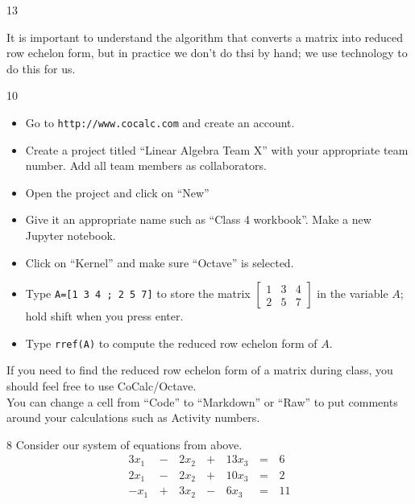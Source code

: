 \begin{applicationActivities}{1}{3}
\begin{remark}
It is important to understand the  algorithm that converts a matrix into reduced row echelon form, but in practice we don't do thsi by hand; we use technology to do this for us.
\end{remark}

\begin{activity}{10}
\begin{itemize}
\item Go to {\tt http://www.cocalc.com} and create an account.
\item Create a project titled ``Linear Algebra Team X'' with your appropriate team number.  Add all team members as collaborators.
\item Open the project and click on ``New''
\item Give it an appropriate name such as ``Class 4 workbook''.  Make a new Jupyter notebook.
\item Click on ``Kernel'' and make sure ``Octave'' is selected.
\item Type {\tt A=[1 3 4 ; 2 5 7]} to store the matrix $\begin{bmatrix} 1 & 3 & 4 \\ 2 & 5 & 7\end{bmatrix}$ in the variable $A$; hold shift when you press enter.
\item Type {\tt rref(A)} to compute the reduced row echelon form of $A$.
\end{itemize}
\end{activity}

\begin{remark}
If you need to find the reduced row echelon form of a matrix during class, you should feel free to use CoCalc/Octave.
\ \\

You can change a cell from ``Code'' to ``Markdown'' or ``Raw'' to put comments around your calculations such as Activity numbers.
\end{remark}

\begin{activity}{8}
Consider our system of equations from above.
 \[
		\begin{alignedat}{4}
   		  3x_1 &\,-\,& 2x_2 &\,+\,& 13x_3 &\,=\,& 6 \\
   		  2x_1 &\,-\,& 2x_2 &\,+\,& 10x_3 &\,=\,& 2 \\
   		  -x_1 &\,+\,& 3x_2 &\,-\,&  6x_3 &\,=\,& 11
   		\end{alignedat} 
\]


\end{activity}
\end{applicationActivities}
